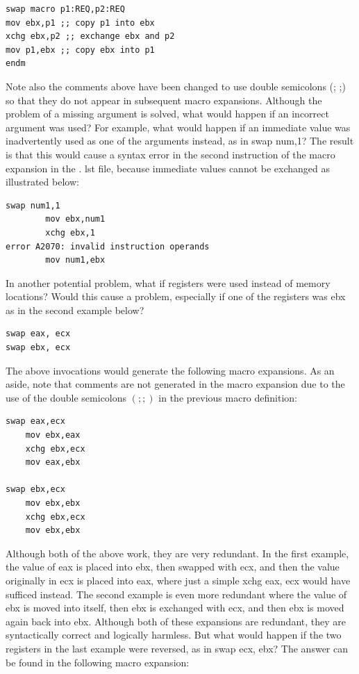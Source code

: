 \documentclass[10pt]{book}
\begin{document}
\begin{verbatim}
swap macro p1:REQ,p2:REQ
mov ebx,p1 ;; copy p1 into ebx
xchg ebx,p2 ;; exchange ebx and p2
mov p1,ebx ;; copy ebx into p1
endm
\end{verbatim}

Note also the comments above have been changed to use double semicolons (; ;) so that they do not appear in subsequent macro expansions. Although the problem of a missing argument is solved, what would happen if an incorrect argument was used? For example, what would happen if an immediate value was inadvertently used as one of the arguments instead, as in swap num,1? The result is that this would cause a syntax error in the second instruction of the macro\\
expansion in the . lst file, because immediate values cannot be exchanged as illustrated below:
\begin{verbatim}
swap num1,1
        mov ebx,num1
        xchg ebx,1
error A2070: invalid instruction operands
        mov num1,ebx
\end{verbatim}

In another potential problem, what if registers were used instead of memory locations? Would this cause a problem, especially if one of the registers was ebx as in the second example below?

\begin{verbatim}
swap eax, ecx
swap ebx, ecx
\end{verbatim}

The above invocations would generate the following macro expansions. As an aside, note that comments are not generated in the macro expansion due to the use of the double semicolons $(; ;)$ in the previous macro definition:

\begin{verbatim}
swap eax,ecx
    mov ebx,eax
    xchg ebx,ecx
    mov eax,ebx

swap ebx,ecx
    mov ebx,ebx
    xchg ebx,ecx
    mov ebx,ebx
\end{verbatim}

Although both of the above work, they are very redundant. In the first example, the value of eax is placed into ebx, then swapped with ecx, and then the value originally in ecx is placed into eax, where just a simple xchg eax, ecx would have sufficed instead. The second example is even more redundant where the value of ebx is moved into itself, then ebx is exchanged with ecx, and then ebx is moved again back into ebx. Although both of these expansions are redundant, they are syntactically correct and logically harmless. But what would happen if the two registers in the last example were reversed, as in swap ecx, ebx? The answer can be found in the following macro expansion:
\end{document}
